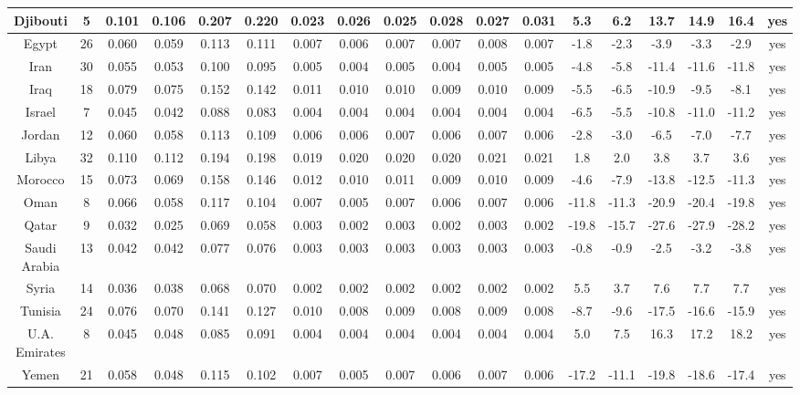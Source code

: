 \documentclass[10pt]{article}
\begin{document}
\begin{center}
\begin{tabular}{|c|c|c|c|c|c|c|c|c|c|c|c|c|c|c|c|c|c|}
\hline
Djibouti & 5 & 0.101 & 0.106 & 0.207 & 0.220 & 0.023 & 0.026 & 0.025 & 0.028 & 0.027 & 0.031 & 5.3 & 6.2 & 13.7 & 14.9 & 16.4 & yes \\
\hline
Egypt & 26 & 0.060 & 0.059 & 0.113 & 0.111 & 0.007 & 0.006 & 0.007 & 0.007 & 0.008 & 0.007 & -1.8 & -2.3 & -3.9 & -3.3 & -2.9 & yes \\
\hline
Iran & 30 & 0.055 & 0.053 & 0.100 & 0.095 & 0.005 & 0.004 & 0.005 & 0.004 & 0.005 & 0.005 & -4.8 & -5.8 & -11.4 & -11.6 & -11.8 & yes \\
\hline
Iraq & 18 & 0.079 & 0.075 & 0.152 & 0.142 & 0.011 & 0.010 & 0.010 & 0.009 & 0.010 & 0.009 & -5.5 & -6.5 & -10.9 & -9.5 & -8.1 & yes \\
\hline
Israel & 7 & 0.045 & 0.042 & 0.088 & 0.083 & 0.004 & 0.004 & 0.004 & 0.004 & 0.004 & 0.004 & -6.5 & -5.5 & -10.8 & -11.0 & -11.2 & yes \\
\hline
Jordan & 12 & 0.060 & 0.058 & 0.113 & 0.109 & 0.006 & 0.006 & 0.007 & 0.006 & 0.007 & 0.006 & -2.8 & -3.0 & -6.5 & -7.0 & -7.7 & yes \\
\hline
Libya & 32 & 0.110 & 0.112 & 0.194 & 0.198 & 0.019 & 0.020 & 0.020 & 0.020 & 0.021 & 0.021 & 1.8 & 2.0 & 3.8 & 3.7 & 3.6 & yes \\
\hline
Morocco & 15 & 0.073 & 0.069 & 0.158 & 0.146 & 0.012 & 0.010 & 0.011 & 0.009 & 0.010 & 0.009 & -4.6 & -7.9 & -13.8 & -12.5 & -11.3 & yes \\
\hline
Oman & 8 & 0.066 & 0.058 & 0.117 & 0.104 & 0.007 & 0.005 & 0.007 & 0.006 & 0.007 & 0.006 & -11.8 & -11.3 & -20.9 & -20.4 & -19.8 & yes \\
\hline
Qatar & 9 & 0.032 & 0.025 & 0.069 & 0.058 & 0.003 & 0.002 & 0.003 & 0.002 & 0.003 & 0.002 & -19.8 & -15.7 & -27.6 & -27.9 & -28.2 & yes \\
\hline
Saudi Arabia & 13 & 0.042 & 0.042 & 0.077 & 0.076 & 0.003 & 0.003 & 0.003 & 0.003 & 0.003 & 0.003 & -0.8 & -0.9 & -2.5 & -3.2 & -3.8 & yes \\
\hline
Syria & 14 & 0.036 & 0.038 & 0.068 & 0.070 & 0.002 & 0.002 & 0.002 & 0.002 & 0.002 & 0.002 & 5.5 & 3.7 & 7.6 & 7.7 & 7.7 & yes \\
\hline
Tunisia & 24 & 0.076 & 0.070 & 0.141 & 0.127 & 0.010 & 0.008 & 0.009 & 0.008 & 0.009 & 0.008 & -8.7 & -9.6 & -17.5 & -16.6 & -15.9 & yes \\
\hline
U.A. Emirates & 8 & 0.045 & 0.048 & 0.085 & 0.091 & 0.004 & 0.004 & 0.004 & 0.004 & 0.004 & 0.004 & 5.0 & 7.5 & 16.3 & 17.2 & 18.2 & yes \\
\hline
Yemen & 21 & 0.058 & 0.048 & 0.115 & 0.102 & 0.007 & 0.005 & 0.007 & 0.006 & 0.007 & 0.006 & -17.2 & -11.1 & -19.8 & -18.6 & -17.4 & yes \\

\end{tabular}
\end{center}
\end{document}
